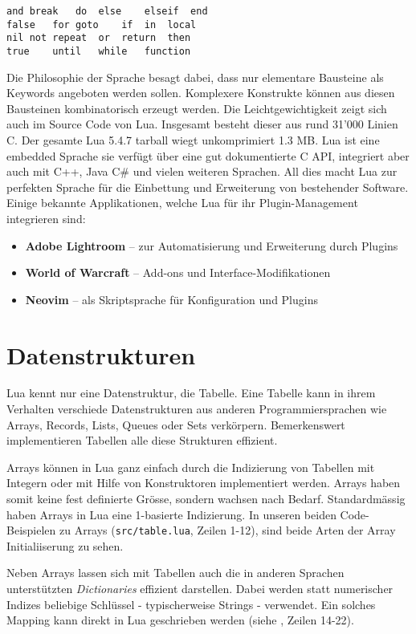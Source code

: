 \documentclass[11pt,a4paper]{article}
\begin{document}
\begin{lstlisting}
and	break	do	else	elseif	end
false	for	goto 	if	in	local
nil	not	repeat	or	return	then
true	until	while	function
\end{lstlisting}

Die Philosophie der Sprache besagt dabei, dass nur elementare Bausteine als Keywords angeboten werden sollen. Komplexere Konstrukte können aus diesen Bausteinen kombinatorisch erzeugt werden. Die Leichtgewichtigkeit zeigt sich auch im Source Code von Lua. Insgesamt besteht dieser aus rund 31’000 Linien C. Der gesamte Lua 5.4.7 tarball wiegt unkomprimiert 1.3 MB.
Lua ist eine embedded Sprache sie verfügt über eine gut dokumentierte C API, integriert aber auch mit C++, Java C\# und vielen weiteren Sprachen. All dies macht Lua zur perfekten Sprache für die Einbettung und Erweiterung von bestehender Software.
Einige bekannte Applikationen, welche Lua für ihr Plugin-Management integrieren sind:

\begin{itemize}
  \item \textbf{Adobe Lightroom} – zur Automatisierung und Erweiterung durch Plugins
  \item \textbf{World of Warcraft} – Add-ons und Interface-Modifikationen
  \item \textbf{Neovim} – als Skriptsprache für Konfiguration und Plugins
\end{itemize}

\section*{Datenstrukturen}

Lua kennt nur eine Datenstruktur, die Tabelle. Eine Tabelle kann in ihrem Verhalten verschiede Datenstrukturen aus anderen Programmiersprachen wie Arrays, Records, Lists, Queues oder Sets verkörpern.
Bemerkenswert implementieren Tabellen alle diese Strukturen effizient.

Arrays können in Lua ganz einfach durch die Indizierung von Tabellen mit Integern oder mit Hilfe von Konstruktoren implementiert werden. 
Arrays haben somit keine fest definierte Grösse, sondern wachsen nach Bedarf.
Standardmässig haben Arrays in Lua eine 1-basierte Indizierung. 
In unseren beiden Code-Beispielen zu Arrays (\texttt{src/table.lua}, Zeilen 1-12), sind beide Arten der Array Initialiiserung zu sehen.

Neben Arrays lassen sich mit Tabellen auch die in anderen Sprachen unterstützten \textit{Dictionaries} effizient darstellen. 
Dabei werden statt numerischer Indizes beliebige Schlüssel - typischerweise Strings - verwendet.
Ein solches Mapping kann direkt in Lua geschrieben werden (siehe , Zeilen 14-22).
\end{document}
